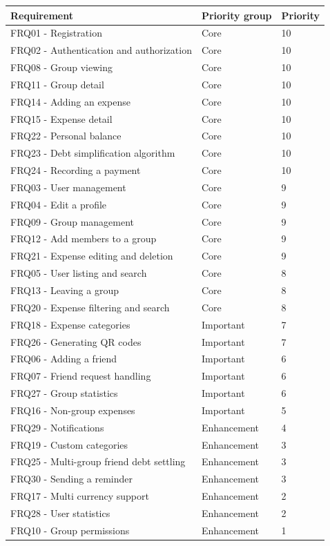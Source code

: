 \documentclass{ctuthesis}
\begin{document}
\begin{table}[ht!]
\centering
\begin{tabularx}{\textwidth}{|X|p{2.7cm}|l|}
\hline
\textbf{Requirement} & \textbf{Priority group} & \textbf{Priority} \\ \hline

FRQ01 - Registration & Core & 10 \\ \hline
FRQ02 - Authentication and authorization & Core & 10 \\ \hline
FRQ08 - Group viewing & Core & 10 \\ \hline
FRQ11 - Group detail & Core & 10 \\ \hline
FRQ14 - Adding an expense & Core & 10 \\ \hline
FRQ15 - Expense detail & Core & 10 \\ \hline
FRQ22 - Personal balance & Core & 10 \\ \hline
FRQ23 - Debt simplification algorithm & Core & 10 \\ \hline
FRQ24 - Recording a payment & Core & 10 \\ \hline
FRQ03 - User management & Core & 9 \\ \hline
FRQ04 - Edit a profile & Core & 9 \\ \hline
FRQ09 - Group management & Core & 9 \\ \hline
FRQ12 - Add members to a group & Core & 9 \\ \hline
FRQ21 - Expense editing and deletion & Core & 9 \\ \hline
FRQ05 - User listing and search & Core & 8 \\ \hline
FRQ13 - Leaving a group & Core & 8 \\ \hline
FRQ20 - Expense filtering and search & Core & 8 \\ \hline

FRQ18 - Expense categories & Important & 7 \\ \hline
FRQ26 - Generating QR codes & Important & 7 \\ \hline
FRQ06 - Adding a friend & Important & 6 \\ \hline
FRQ07 - Friend request handling & Important & 6 \\ \hline
FRQ27 - Group statistics & Important & 6 \\ \hline
FRQ16 - Non-group expenses & Important & 5 \\ \hline

FRQ29 - Notifications & Enhancement & 4 \\ \hline
FRQ19 - Custom categories & Enhancement & 3 \\ \hline
FRQ25 - Multi-group friend debt settling & Enhancement & 3 \\ \hline
FRQ30 - Sending a reminder & Enhancement & 3 \\ \hline
FRQ17 - Multi currency support & Enhancement & 2 \\ \hline
FRQ28 - User statistics & Enhancement & 2 \\ \hline
FRQ10 - Group permissions & Enhancement & 1 \\ \hline


\end{tabularx}
\end{table}
\end{document}
